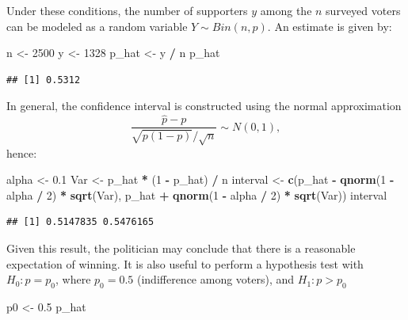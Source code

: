 \documentclass[
]{article}
\newenvironment{Shaded}{\begin{snugshade}}{\end{snugshade}}
\newcommand{\DecValTok}[1]{\textcolor[rgb]{0.00,0.00,0.81}{#1}}
\newcommand{\FloatTok}[1]{\textcolor[rgb]{0.00,0.00,0.81}{#1}}
\newcommand{\FunctionTok}[1]{\textcolor[rgb]{0.13,0.29,0.53}{\textbf{#1}}}
\newcommand{\NormalTok}[1]{#1}
\newcommand{\OtherTok}[1]{\textcolor[rgb]{0.56,0.35,0.01}{#1}}
\newcommand{\SpecialCharTok}[1]{\textcolor[rgb]{0.81,0.36,0.00}{\textbf{#1}}}
\begin{document}
Under these conditions, the number of supporters \(y\) among the \(n\)
surveyed voters can be modeled as a random variable
\(Y \sim Bin(n, p)\). An estimate is given by:

\begin{Shaded}
\begin{Highlighting}[]
\NormalTok{n }\OtherTok{\textless{}{-}} \DecValTok{2500}
\NormalTok{y }\OtherTok{\textless{}{-}} \DecValTok{1328}
\NormalTok{p\_hat }\OtherTok{\textless{}{-}}\NormalTok{ y }\SpecialCharTok{/}\NormalTok{ n}
\NormalTok{p\_hat}
\end{Highlighting}
\end{Shaded}

\begin{verbatim}
## [1] 0.5312
\end{verbatim}

In general, the confidence interval is constructed using the normal
approximation \[\frac{\hat{p}-p}{\sqrt{p(1-p)}/\sqrt{n}} \sim N(0,1),\]
hence:

\begin{Shaded}
\begin{Highlighting}[]
\NormalTok{alpha }\OtherTok{\textless{}{-}} \FloatTok{0.1}
\NormalTok{Var }\OtherTok{\textless{}{-}}\NormalTok{ p\_hat }\SpecialCharTok{*}\NormalTok{ (}\DecValTok{1} \SpecialCharTok{{-}}\NormalTok{ p\_hat) }\SpecialCharTok{/}\NormalTok{ n}
\NormalTok{interval }\OtherTok{\textless{}{-}} \FunctionTok{c}\NormalTok{(p\_hat }\SpecialCharTok{{-}} \FunctionTok{qnorm}\NormalTok{(}\DecValTok{1} \SpecialCharTok{{-}}\NormalTok{ alpha }\SpecialCharTok{/} \DecValTok{2}\NormalTok{) }\SpecialCharTok{*} \FunctionTok{sqrt}\NormalTok{(Var), }
\NormalTok{              p\_hat }\SpecialCharTok{+} \FunctionTok{qnorm}\NormalTok{(}\DecValTok{1} \SpecialCharTok{{-}}\NormalTok{ alpha }\SpecialCharTok{/} \DecValTok{2}\NormalTok{) }\SpecialCharTok{*} \FunctionTok{sqrt}\NormalTok{(Var))}
\NormalTok{interval}
\end{Highlighting}
\end{Shaded}

\begin{verbatim}
## [1] 0.5147835 0.5476165
\end{verbatim}

Given this result, the politician may conclude that there is a
reasonable expectation of winning. It is also useful to perform a
hypothesis test with \(H_0: p = p_0\), where \(p_0 = 0.5\) (indifference
among voters), and \(H_1: p > p_0\)

\begin{Shaded}
\begin{Highlighting}[]
\NormalTok{p0 }\OtherTok{\textless{}{-}} \FloatTok{0.5}
\NormalTok{p\_hat}
\end{Highlighting}
\end{Shaded}
\end{document}
